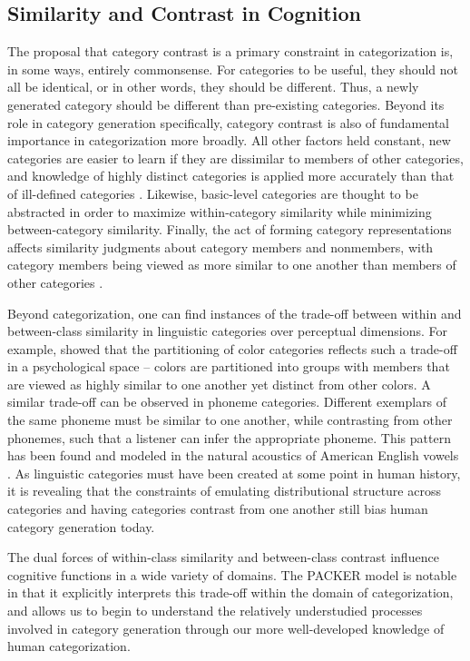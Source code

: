 \documentclass[12pt]{article}
\begin{document}
\begin{flushleft}
\subsection{Similarity and Contrast in Cognition}
The proposal that category contrast is a primary constraint in categorization is, in some ways, entirely commonsense. For categories to be useful, they should not all be identical, or in other words, they should be different. Thus, a newly generated category should be different than pre-existing categories. Beyond its role
in category generation specifically, category contrast is also of fundamental importance in
categorization more broadly. All other factors held constant, new categories are
easier to learn if they are dissimilar to members of other categories, and
knowledge of highly distinct categories is applied more accurately than that of
ill-defined categories \citep{ashby1994categorization,imai1965discriminability}.
Likewise, basic-level categories \citep{rosch1976basic} are thought to be
abstracted in order to maximize within-category similarity while minimizing
between-category similarity. Finally, the act of forming category
representations affects similarity judgments about category members and
nonmembers, with category members being viewed as more similar to one another
than members of other categories
\citep{goldstone1994influences,goldstone2001altering,goldstone1996isolated}.

Beyond categorization, one can find instances of the trade-off between within
and between-class similarity in linguistic categories over perceptual
dimensions. For example, \cite{regier2007} showed that the partitioning of color
categories reflects such a trade-off in a psychological space -- colors are
partitioned into groups with members that are viewed as highly similar to one
another yet distinct from other colors. A similar trade-off can be observed in
phoneme categories. Different exemplars of the same phoneme must be similar to
one another, while contrasting from other phonemes, such that a listener can
infer the appropriate phoneme. This pattern has been found and modeled in the
natural acoustics of American English vowels
\citep{feldman2013,hillenbrand1995}. As linguistic categories must have been
created at some point in human history, it is revealing that the constraints of
emulating distributional structure across categories and having categories
contrast from one another still bias human category generation today.

The dual forces of within-class similarity and between-class contrast influence
cognitive functions in a wide variety of domains. The PACKER model is notable in
that it explicitly interprets this trade-off within the domain of categorization, and allows us to begin to understand the relatively understudied
processes involved in category generation through our more well-developed
knowledge of human categorization.



\end{flushleft}
\end{document}
